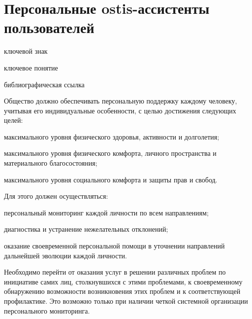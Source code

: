 \section{Персональные ostis-ассистенты пользователей}
{\label{sec_ostis_assistant}} 

\begin{SCn}

\begin{scnrelfromlist}{ключевой знак}
\end{scnrelfromlist}

\begin{scnrelfromlist}{ключевое понятие}
\end{scnrelfromlist}

\begin{scnrelfromlist}{библиографическая ссылка}
\end{scnrelfromlist}

\end{SCn}

Общество должно обеспечивать персональную поддержку каждому человеку, учитывая его индивидуальные особенности, с целью достижения следующих целей:
\begin{textitemize}
    \item максимального уровня физического здоровья, активности и долголетия;
    \item максимального уровня физического комфорта, личного пространства и материального благосостояния;
    \item максимального уровня социального комфорта и защиты прав и свобод.
\end{textitemize}

Для этого должен осуществляться:
\begin{textitemize}
    \item персональный мониторинг каждой личности по всем направлениям;
    \item диагностика и устранение нежелательных отклонений;
    \item оказание своевременной персональной помощи в уточнении направлений дальнейшей эволюции каждой личности.
\end{textitemize}

Необходимо перейти от оказания услуг в решении различных проблем по инициативе самих лиц, столкнувшихся с этими проблемами, к своевременному обнаружению возможности возникновения этих проблем и к соответствующей профилактике. 
Это возможно только при наличии четкой системной организации персонального мониторинга. 

